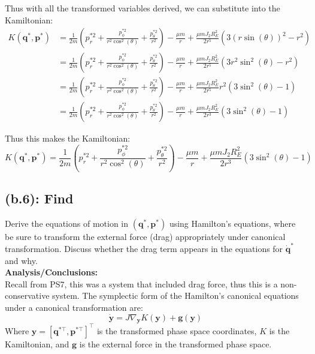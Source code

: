 \documentclass[titlepage]{article}
\begin{document}
Thus with all the transformed variables derived, we can substitute into the Kamiltonian:
\begin{equation}
	\begin{split}
		K(\boldsymbol{q}^*,\boldsymbol{p}^*)&=\frac{1}{2m}\left(p_r^{*2}+\frac{p_\phi^{*2}}{r^2\cos^2(\theta)}+\frac{p_\theta^{*2}}{r^2}\right)-\frac{\mu m}{r}+\frac{\mu mJ_2R_E^2}{2r^5}\left(3\left(r\sin(\theta)\right)^2-r^2\right) \\
		&=\frac{1}{2m}\left(p_r^{*2}+\frac{p_\phi^{*2}}{r^2\cos^2(\theta)}+\frac{p_\theta^{*2}}{r^2}\right)-\frac{\mu m}{r}+\frac{\mu mJ_2R_E^2}{2r^5}\left(3r^2\sin^2(\theta)-r^2\right) \\
		&=\frac{1}{2m}\left(p_r^{*2}+\frac{p_\phi^{*2}}{r^2\cos^2(\theta)}+\frac{p_\theta^{*2}}{r^2}\right)-\frac{\mu m}{r}+\frac{\mu mJ_2R_E^2}{2r^5}r^2\left(3\sin^2(\theta)-1\right) \\
		&=\frac{1}{2m}\left(p_r^{*2}+\frac{p_\phi^{*2}}{r^2\cos^2(\theta)}+\frac{p_\theta^{*2}}{r^2}\right)-\frac{\mu m}{r}+\frac{\mu mJ_2R_E^2}{2r^3}\left(3\sin^2(\theta)-1\right)
	\end{split}
\end{equation}

\begin{mdframed}[linewidth=1pt, innertopmargin=10pt, innerbottommargin=10pt]
	Thus this makes the Kamiltonian:
	\begin{equation}
		K(\boldsymbol{q}^*,\boldsymbol{p}^*)=\frac{1}{2m}\left(p_r^{*2}+\frac{p_\phi^{*2}}{r^2\cos^2(\theta)}+\frac{p_\theta^{*2}}{r^2}\right)-\frac{\mu m}{r}+\frac{\mu mJ_2R_E^2}{2r^3}\left(3\sin^2(\theta)-1\right)
	\end{equation}
\end{mdframed}

\newpage

\subsection*{(b.6): Find}

Derive the equations of motion in $(\boldsymbol{q}^*,\boldsymbol{p}^*)$ using Hamilton's equations, where be sure to transform the external force (drag) appropriately under canonical transformation. Discuss whether the drag term appears in the equations for $\dot{\boldsymbol{q}}^*$ and why. \\

\textbf{Analysis/Conclusions:} \\

Recall from PS7, this was a system that included drag force, thus this is a non-conservative system. The symplectic form of the Hamilton's canonical equations under a canonical transformation are:
\begin{equation}
	\dot{\boldsymbol{y}}=J\nabla_{\boldsymbol{y}}K(\boldsymbol{y})+\boldsymbol{g}(\boldsymbol{y})
\end{equation}
Where $\boldsymbol{y}=[\boldsymbol{q}^{*\top},\boldsymbol{p}^{*\top}]^\top$ is the transformed phase space coordinates, $K$ is the Kamiltonian, and $\boldsymbol{g}$ is the external force in the transformed phase space. \\
\end{document}

